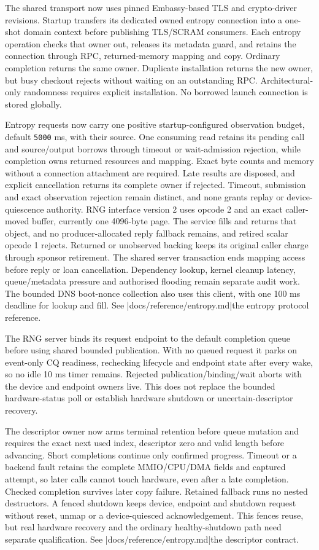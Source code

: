 The shared transport now uses pinned Embassy-based TLS and crypto-driver
revisions. Startup transfers its dedicated owned entropy connection into a
one-shot domain context before publishing TLS/SCRAM consumers. Each entropy
operation checks that owner out, releases its metadata guard, and retains the
connection through RPC, returned-memory mapping and copy. Ordinary completion
returns the same owner. Duplicate installation returns the new owner, but busy
checkout rejects without waiting on an outstanding RPC. Architectural-only
randomness requires explicit installation. No borrowed launch connection is
stored globally.

Entropy requests now carry one positive startup-configured observation budget,
default \texttt{5000} ms, with their source. One consuming read retains its
pending call and source/output borrows through timeout or wait-admission rejection, while
completion owns returned resources and mapping. Exact byte counts and memory
without a connection attachment are required. Late results are disposed, and
explicit cancellation returns its complete owner if rejected. Timeout,
submission and exact observation rejection remain distinct, and none grants replay
or device-quiescence authority. RNG interface version 2 uses opcode 2 and an
exact caller-moved buffer, currently one 4096-byte page. The service fills and
returns that object, and no producer-allocated reply fallback remains, and retired
scalar opcode 1 rejects. Returned or unobserved backing keeps its original
caller charge through sponsor retirement. The shared server transaction ends
mapping access before reply or loan cancellation. Dependency lookup, kernel
cleanup latency, queue/metadata pressure and authorised flooding remain separate
audit work. The bounded DNS boot-nonce collection also uses this client, with
one 100 ms deadline for lookup and fill. See
\repofiletext|docs/reference/entropy.md|{the entropy protocol reference}.

The RNG server binds its request endpoint to the default completion queue before
using shared bounded publication. With no queued request it parks on event-only
CQ readiness, rechecking lifecycle and endpoint state after every wake, so no idle
10 ms timer remains. Rejected publication/binding/wait aborts with the device
and endpoint owners live. This does not replace the bounded hardware-status poll
or establish hardware shutdown or uncertain-descriptor recovery.

The descriptor owner now arms terminal retention before queue mutation and
requires the exact next used index, descriptor zero and valid length before
advancing. Short completions continue only confirmed progress. Timeout or a
backend fault retains the complete MMIO/CPU/DMA fields and captured attempt, so
later calls cannot touch hardware, even after a late completion. Checked
completion survives later copy failure. Retained fallback runs no nested
destructors. A fenced shutdown keeps device, endpoint and shutdown request
without reset, unmap or a device-quiesced acknowledgement. This fences reuse, but
real hardware recovery and the ordinary healthy-shutdown path need separate
qualification. See \repofiletext|docs/reference/entropy.md|{the descriptor contract}.

